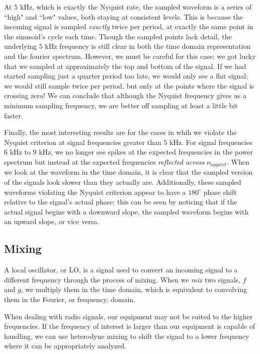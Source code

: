 \documentclass[12pt]{article}
\begin{document}
At $5$ kHz, which is exactly the Nyquist rate, the sampled waveform is a series of ``high" and ``low" values, both staying at consistent levels. This is because the incoming signal is sampled \textit{exactly} twice per period, at exactly the same point in the sinusoid's cycle each time. Though the sampled points lack detail, the underlying $5$ kHz frequency is still clear in both the time domain representation and the fourier spectrum. However, we must be careful for this case; we got lucky that we sampled at approximately the top and bottom of the signal. If we had started sampling just a quarter period too late, we would only see a flat signal; we would still sample twice per period, but only at the points where the signal is crossing zero! We can conclude that although the Nyquist frequency gives us a minimum sampling frequency, we are better off sampling at least a little bit faster.

Finally, the most interesting results are for the cases in whih we violate the Nyquist criterion at signal frequencies greater than $5$ kHz. For signal frequencies $6$ kHz to $9$ kHz, we no longer see spikes at the expected frequencies in the power spectrum but instead at the expected frequencies \textit{reflected across} $\nu_{nyquist}$. When we look at the waveform in the time domain, it is clear that the sampled version of the signals look slower than they actually are.  Additionally, these sampled waveforms violating the Nyquist criterion appear to have a $180^\circ$ phase shift relative to the signal's actual phase; this can be seen by noticing that if the actual signal begins with a downward slope, the sampled waveform begins with an upward slope, or vice versa.

\subsection{Mixing} 

A local oscillator, or LO, is a signal used to convert an incoming signal to a different frequency through the process of mixing. When we \textit{mix} two signals, $f$ and $g$, we multiply them in the time domain, which is equivalent to convolving them in the Fourier, or frequency, domain.

When dealing with radio signals, our equipment may not be suited to the higher frequencies. If the frequency of interest is larger than our equipment is capable of handling, we can use heterodyne mixing to shift the signal to a lower frequency where it can be appropriately analyzed.
\end{document}
